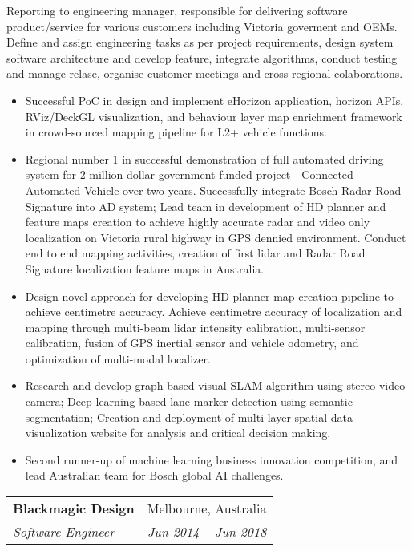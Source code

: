 \documentclass[letterpaper,11pt]{article}
\makeatletter
\newcommand{\resumeItemNoBullet}[4]{
  \vspace{-1pt}
    \begin{tabular*}{0.97\textwidth}{l@{\extracolsep{\fill}}r}
      \textbf{#1} & #2 \\
      \textit{\small#3} & \textit{\small #4} \\
    \end{tabular*}\vspace{-7pt}
}
\newcommand{\resumeSubHeadingListStart}{\begin{itemize}[leftmargin=*]}
\newcommand{\resumeSubHeadingListEnd}{\end{itemize}}
\makeatother
\begin{document}
\vspace{10pt}
{Reporting to engineering manager, responsible for delivering software product/service for various customers including Victoria goverment and OEMs. Define and assign engineering tasks as per project requirements, design system software architecture and develop feature, integrate algorithms, conduct testing and manage relase, organise customer meetings and cross-regional colaborations. }
  \resumeSubHeadingListStart
    \item Successful PoC in design and implement eHorizon application, horizon APIs, RViz/DeckGL visualization, and behaviour layer map enrichment framework in crowd-sourced mapping pipeline for L2+ vehicle functions.
    \item Regional number 1 in successful demonstration of full automated driving system for 2 million dollar government funded project - Connected Automated Vehicle over two years. Successfully integrate Bosch Radar Road Signature into AD system; Lead team in development of HD planner and feature maps creation to achieve highly accurate radar and video only localization on Victoria rural highway in GPS dennied environment. Conduct end to end mapping activities, creation of first lidar and Radar Road Signature localization feature maps in Australia.
    \item Design novel approach for developing HD planner map creation pipeline to achieve centimetre accuracy. Achieve centimetre accuracy of localization and mapping through multi-beam lidar intensity calibration, multi-sensor calibration, fusion of GPS inertial sensor and vehicle odometry, and optimization of multi-modal localizer.
    \item Research and develop graph based visual SLAM algorithm using stereo video camera; Deep learning based lane marker detection using semantic segmentation; Creation and deployment of multi-layer spatial data visualization website for analysis and critical decision making.
    \item Second runner-up of machine learning business innovation competition, and lead Australian team for Bosch global AI challenges. 
  \resumeSubHeadingListEnd

\resumeItemNoBullet
{Blackmagic Design}{Melbourne, Australia}
{Software Engineer}{Jun 2014 -- Jun 2018}
\end{document}
